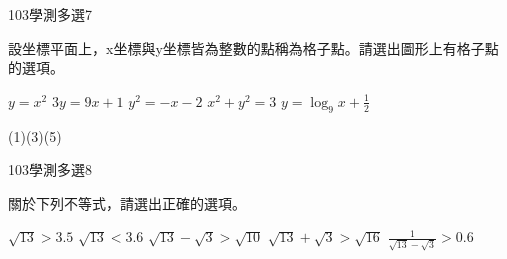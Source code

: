 \begin{QUESTIONS}
    \begin{QUESTION}
        \begin{ExamInfo}{103}{學測}{多選}{7}
        \end{ExamInfo}
        \begin{ExamAnsRateInfo}{62}{89}{65}{32}
        \end{ExamAnsRateInfo}
        \begin{QBODY}
			設坐標平面上，x坐標與y坐標皆為整數的點稱為格子點。請選出圖形上有格子點的選項。
			\begin{QOPS}
				\QOP $y={{x}^{2}}$
				\QOP $3y=9x+1$
				\QOP ${{y}^{2}}=-x-2$
				\QOP ${{x}^{2}}+{{y}^{2}}=3$
				\QOP $y={{\log }_{9}}x+\frac{1}{2}$
			\end{QOPS}
        \end{QBODY}
        \begin{QFROMS}
        \end{QFROMS}
        \begin{QTAGS}\end{QTAGS}
        \begin{QANS}
            (1)(3)(5)
        \end{QANS}
        \begin{QSOLLIST}
        \end{QSOLLIST}
        \begin{QEMPTYSPACE}
        \end{QEMPTYSPACE}
    \end{QUESTION}
    \begin{QUESTION}
        \begin{ExamInfo}{103}{學測}{多選}{8}
        \end{ExamInfo}
        \begin{ExamAnsRateInfo}{73}{92}{82}{45}
        \end{ExamAnsRateInfo}
        \begin{QBODY}
			關於下列不等式，請選出正確的選項。
			\begin{QOPS}
				\QOP $\sqrt{13}>3.5$
				\QOP $\sqrt{13}<3.6$
				\QOP $\sqrt{13}-\sqrt{3}>\sqrt{10}$
				\QOP $\sqrt{13}+\sqrt{3}>\sqrt{16}$
				\QOP $\frac{1}{\sqrt{13}-\sqrt{3}}>0.6$
			\end{QOPS}
        \end{QBODY}
        \begin{QFROMS}
        \end{QFROMS}
        \begin{QTAGS}\end{QTAGS}

\end{QUESTION}
\end{QUESTIONS}
